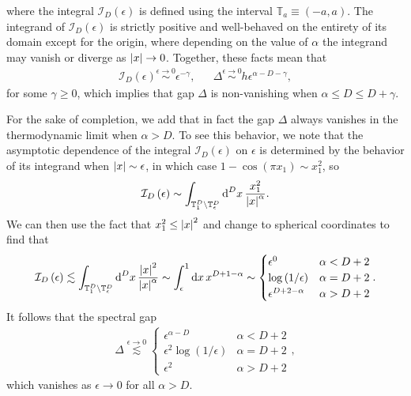 \documentclass[nofootinbib,notitlepage,11pt]{revtex4-2}
\newcommand{\f}[2]{\dfrac{#1}{#2}} %
\newcommand{\p}[1]{\left(#1\right)} %
\newcommand{\1}{\mathds{1}}
\renewcommand{\d}{\text{d}}
\newcommand{\I}{\mathcal{I}}
\newcommand{\TT}{\mathbb{T}}
\begin{document}
where the integral $\I_D\p{\epsilon}$ is defined using the interval
$\TT_a\equiv\p{-a,a}$.  The integrand of $\I_D\p{\epsilon}$ is
strictly positive and well-behaved on the entirety of its domain
except for the origin, where depending on the value of $\alpha$ the
integrand may vanish or diverge as $\abs{x}\to0$.  Together, these
facts mean that
\begin{align}
  \I_D\p{\epsilon} \stackrel{\epsilon\to0}{\sim} \epsilon^{-\gamma},
  &&
  \Delta \stackrel{\epsilon\to0}{\sim} h \epsilon^{\alpha-D-\gamma},
\end{align}
for some $\gamma\ge0$, which implies that gap $\Delta$ is
non-vanishing when $\alpha\le D\le D+\gamma$.

For the sake of completion, we add that in fact the gap $\Delta$
always vanishes in the thermodynamic limit when $\alpha>D$.  To see
this behavior, we note that the asymptotic dependence of the integral
$\I_D\p{\epsilon}$ on $\epsilon$ is determined by the behavior of its
integrand when $\abs{x}\sim\epsilon$, in which case
$1-\cos\p{\pi x_1}\sim x_1^2$, so
\begin{align}
  \I_D\p{\epsilon}
  \sim \int_{\TT_1^D\setminus\TT_\epsilon^D} \d^Dx\,
  \f{x_1^2}{\abs{x}^\alpha}.
\end{align}
We can then use the fact that $x_1^2\le\abs{x}^2$ and change to
spherical coordinates to find that
\begin{align}
  \I_D\p{\epsilon} \lesssim
  \int_{\TT_1^D\setminus\TT_\epsilon^D} \d^Dx\,
  \f{\abs{x}^2}{\abs{x}^\alpha}
  \sim \int_\epsilon^1 \d x\, x^{D+1-\alpha}
  \sim
  \begin{cases}
    \epsilon^0 & \alpha < D+2 \\
    \log\p{1/\epsilon} & \alpha = D+2 \\
    \epsilon^{D+2-\alpha} & \alpha > D+2
  \end{cases}.
\end{align}
It follows that the spectral gap
\begin{align}
  \Delta \stackrel{\epsilon\to0}{\lesssim}
  \begin{cases}
    \epsilon^{\alpha-D} & \alpha < D+2 \\
    \epsilon^2 \log\p{1/\epsilon} & \alpha = D + 2 \\
    \epsilon^2 & \alpha > D+2
  \end{cases},
\end{align}
which vanishes as $\epsilon\to0$ for all $\alpha>D$.

\end{document}
